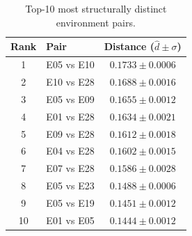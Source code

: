 \begin{table}[htbp]
\centering
\caption{Top-10 most structurally distinct environment pairs.}
\label{tab:most_distinct}
\begin{tabular}{clc}
\toprule
\textbf{Rank} & \textbf{Pair} & \textbf{Distance ($\hat{d} \pm \sigma$)} \\
\midrule
1 & E05 vs E10 & $0.1733 \pm 0.0006$ \\
2 & E10 vs E28 & $0.1688 \pm 0.0016$ \\
3 & E05 vs E09 & $0.1655 \pm 0.0012$ \\
4 & E01 vs E28 & $0.1634 \pm 0.0021$ \\
5 & E09 vs E28 & $0.1612 \pm 0.0018$ \\
6 & E04 vs E28 & $0.1602 \pm 0.0015$ \\
7 & E07 vs E28 & $0.1586 \pm 0.0028$ \\
8 & E05 vs E23 & $0.1488 \pm 0.0006$ \\
9 & E05 vs E19 & $0.1451 \pm 0.0012$ \\
10 & E01 vs E05 & $0.1444 \pm 0.0012$ \\
\bottomrule
\end{tabular}
\end{table}
